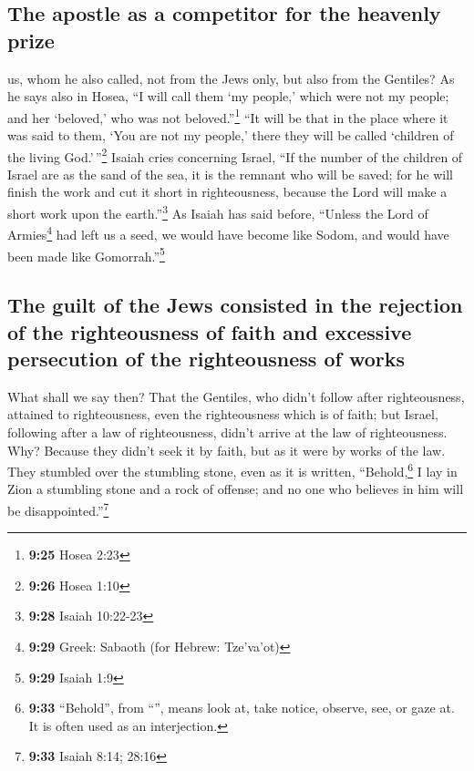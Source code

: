 \hypertarget{the-apostle-as-a-competitor-for-the-heavenly-prize}{%
\subsection{The apostle as a competitor for the heavenly
prize}\label{the-apostle-as-a-competitor-for-the-heavenly-prize}}

 us, whom he also called, not from the Jews only, but
also from the Gentiles?  As he says also in Hosea, ``I
will call them `my people,' which were not my people; and her `beloved,'
who was not beloved.''\footnote{\textbf{9:25} Hosea 2:23}
 ``It will be that in the place where it was said to
them, `You are not my people,' there they will be called `children of
the living God.'\,''\footnote{\textbf{9:26} Hosea 1:10} 
Isaiah cries concerning Israel, ``If the number of the children of
Israel are as the sand of the sea, it is the remnant who will be saved;
 for he will finish the work and cut it short in
righteousness, because the Lord will make a short work upon the
earth.''\footnote{\textbf{9:28} Isaiah 10:22-23}  As
Isaiah has said before, ``Unless the Lord of Armies\footnote{\textbf{9:29}
  Greek: Sabaoth (for Hebrew: Tze'va'ot)} had left us a seed, we would
have become like Sodom, and would have been made like
Gomorrah.''\footnote{\textbf{9:29} Isaiah 1:9}

\hypertarget{the-guilt-of-the-jews-consisted-in-the-rejection-of-the-righteousness-of-faith-and-excessive-persecution-of-the-righteousness-of-works}{%
\subsection{The guilt of the Jews consisted in the rejection of the
righteousness of faith and excessive persecution of the righteousness of
works}\label{the-guilt-of-the-jews-consisted-in-the-rejection-of-the-righteousness-of-faith-and-excessive-persecution-of-the-righteousness-of-works}}

 What shall we say then? That the Gentiles, who didn't
follow after righteousness, attained to righteousness, even the
righteousness which is of faith;  but Israel, following
after a law of righteousness, didn't arrive at the law of righteousness.
 Why? Because they didn't seek it by faith, but as it
were by works of the law. They stumbled over the stumbling stone,
 even as it is written, ``Behold,\footnote{\textbf{9:33}
  ``Behold'', from ``'', means look at, take notice,
  observe, see, or gaze at. It is often used as an interjection.} I lay
in Zion a stumbling stone and a rock of offense; and no one who believes
in him will be disappointed.''\footnote{\textbf{9:33} Isaiah 8:14; 28:16}

